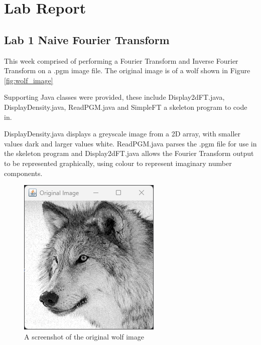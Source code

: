 \chapter{Lab Report}
\section{Lab 1 Naive Fourier Transform}
    This week comprised of performing a Fourier Transform and Inverse Fourier Transform on a .pgm image file. The original image is of a wolf shown in Figure \autoref{fig:wolf_image}

    Supporting Java classes were provided, these include Display2dFT.java, DisplayDensity.java, ReadPGM.java and SimpleFT a skeleton program to code in.

    DisplayDensity.java displays a greyscale image from a 2D array, with smaller values dark and larger values white. ReadPGM.java parses the .pgm file for use in the skeleton program and Display2dFT.java allows the Fourier Transform output to be represented graphically, using colour to represent imaginary number components.
    
    \begin{figure}[H]
        \centering
        \includegraphics[width=0.8\columnwidth]{Figures/Week 1/W1-Wolf-Original.png}
        \caption{A screenshot of the original wolf image}
        \label{fig:wolf_image}
        
    \end{figure}
    
